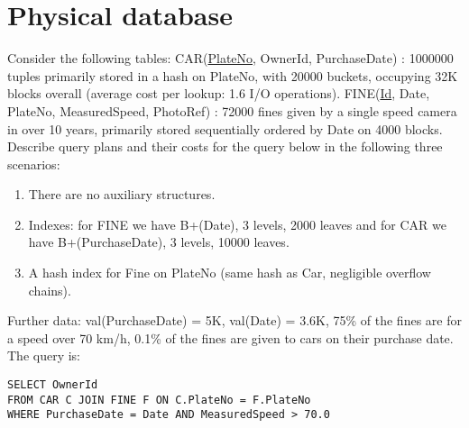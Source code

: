 \section{Physical database}

Consider the following tables: 
CAR(\underline{PlateNo}, OwnerId, PurchaseDate) : 1000000 tuples primarily stored in a hash on PlateNo, with 20000 buckets, occupying 32K blocks overall (average cost per lookup: 1.6 I/O operations).
FINE(\underline{Id}, Date, PlateNo, MeasuredSpeed, PhotoRef) : 72000 fines given by a single speed camera in over 10 years, primarily stored sequentially ordered by Date on 4000 blocks.
Describe query plans and their costs for the query below in the following three scenarios: 
\begin{enumerate}
    \item There are no auxiliary structures. 
    \item Indexes: for FINE we have B+(Date), 3 levels, 2000 leaves and for CAR we have B+(PurchaseDate), 3 levels, 10000 leaves. 
    \item A hash index for Fine on PlateNo (same hash as Car, negligible overflow chains).
\end{enumerate}
Further data: val(PurchaseDate) = 5K, val(Date) = 3.6K, 75\% of the fines are for a speed over 70 km/h, 0.1\% of the fines are given to cars on their purchase date.
The query is: 
\begin{lstlisting}[style=SQL]
SELECT OwnerId 
FROM CAR C JOIN FINE F ON C.PlateNo = F.PlateNo
WHERE PurchaseDate = Date AND MeasuredSpeed > 70.0
\end{lstlisting}

